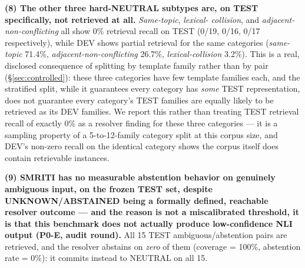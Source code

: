 \textbf{(8) The other three hard-NEUTRAL subtypes are, on TEST
specifically, not retrieved at all.} \emph{Same-topic}, \emph{lexical-
collision}, and \emph{adjacent-non-conflicting} all show 0\% retrieval
recall on TEST (0/19, 0/16, 0/17 respectively), while DEV shows partial
retrieval for the same categories (\emph{same-topic} 71.4\%,
\emph{adjacent-non-conflicting} 26.7\%, \emph{lexical-collision} 3.2\%).
This is a real, disclosed consequence of splitting by template family
rather than by pair (\S\ref{sec:controlled}): these three categories
have few template families each, and the stratified split, while it
guarantees every category has \emph{some} TEST representation, does not
guarantee every category's TEST families are equally likely to be
retrieved as its DEV families. We report this rather than treating TEST
retrieval recall of exactly 0\% as a resolver finding for these three
categories --- it is a sampling property of a 5-to-12-family category
split at this corpus size, and DEV's non-zero recall on the identical
category shows the corpus itself does contain retrievable instances.

\textbf{(9) SMRITI has no measurable abstention behavior on genuinely
ambiguous input, on the frozen TEST set, despite UNKNOWN/ABSTAINED being
a formally defined, reachable resolver outcome --- and the reason is not
a miscalibrated threshold, it is that this benchmark does not actually
produce low-confidence NLI output (P0-E, audit round).} All 15 TEST
ambiguous/abstention pairs are retrieved, and the resolver abstains on
\emph{zero} of them (coverage = 100\%, abstention rate = 0\%): it
commits instead to NEUTRAL on all 15.



